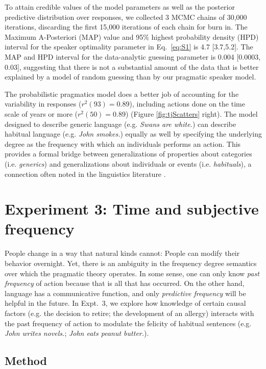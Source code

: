 \documentclass[10pt,letterpaper]{article}
\begin{document}
To attain credible values of the model parameters as well as the posterior predictive distribution over responses, we collected 3 MCMC chains of 30,000 iterations, discarding the first 15,000 iterations of each chain for burn in.
The Maximum A-Posteriori (MAP) value and 95\% highest probability density (HPD) interval for the speaker optimality parameter in Eq.~\ref{eq:S1} is 4.7 [3.7,5.2].
The MAP and HPD interval for the data-analytic guessing parameter is 0.004 [0.0003, 0.03], suggesting that there is not a substantial amount of the data that is better explained by a model of random guessing than by our pragmatic speaker model.

The probabilistic pragmatics model does a better job of accounting for the variability in responses ($r^2(93) = 0.89$), including actions done on the time scale of years or more  ($r^2(50) = 0.89$) (Figure \ref{fig:tjScatters} right).
The model designed to describe generic language (e.g. \emph{Swans are white.}) can describe habitual language (e.g. \emph{John smokes.}) equally as well by specifying the underlying degree as the frequency with which an individuals performs an action.
This provides a formal bridge between generalizations of properties about categories (i.e. \emph{generics}) and generalizations about individuals or events (i.e. \emph{habituals}), a connection often noted in the linguistics literature \cite{Carlson1977, Carlson2005, Cohen1999}. 

\section{Experiment 3: Time and subjective frequency}

People change in a way that natural kinds cannot: People can modify their behavior overnight.
Yet, there is an ambiguity in the frequency degree semantics over which the pragmatic theory operates.
In some sense, one can only know \emph{past frequency} of action because that is all that has occurred.
On the other hand, language has a communicative function, and only \emph{predictive frequency} will be helpful in the future.
In Expt.~3, we explore how knowledge of certain causal factors (e.g. the decision to retire; the development of an allergy) interacts with the past frequency of action to modulate the felicity of habitual sentences (e.g. \emph{John writes novels.}; \emph{John eats peanut butter.}).

\subsection{Method}
\end{document}
